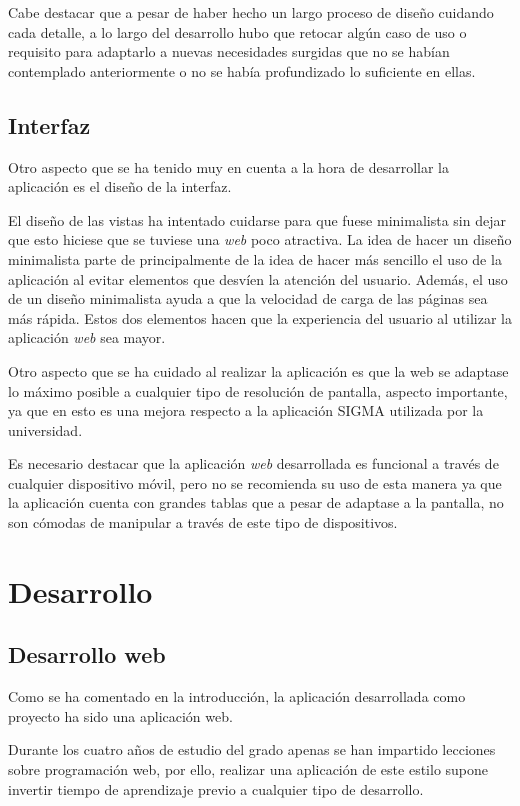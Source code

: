 Cabe destacar que a pesar de haber hecho un largo proceso de diseño cuidando cada detalle, a lo largo del desarrollo hubo que retocar algún caso de uso o requisito para adaptarlo a nuevas necesidades surgidas que no se habían contemplado anteriormente o no se había profundizado lo suficiente en ellas.

\subsection{Interfaz}
Otro aspecto que se ha tenido muy en cuenta a la hora de desarrollar la aplicación es el diseño de la interfaz.

El diseño de las vistas ha intentado cuidarse para que fuese minimalista sin dejar que esto hiciese que se tuviese una \textit{web} poco atractiva.
La idea de hacer un diseño minimalista parte de principalmente de la idea de hacer más sencillo el uso de la aplicación al evitar elementos que desvíen la atención del usuario.
Además, el uso de un diseño minimalista ayuda a que la velocidad de carga de las páginas sea más rápida.
Estos dos elementos hacen que la experiencia del usuario al utilizar la aplicación \textit{web} sea mayor.

Otro aspecto que se ha cuidado al realizar la aplicación es que la web se adaptase lo máximo posible a cualquier tipo de resolución de pantalla, aspecto importante, ya que en esto es una mejora respecto a la aplicación SIGMA utilizada por la universidad.

Es necesario destacar que la aplicación \textit{web} desarrollada es funcional a través de cualquier dispositivo móvil, pero no se recomienda su uso de esta manera ya que la aplicación cuenta con grandes tablas que a pesar de adaptase a la pantalla, no son cómodas de manipular a través de este tipo de dispositivos.

\section{Desarrollo}
\subsection{Desarrollo web}
Como se ha comentado en la introducción, la aplicación desarrollada como proyecto ha sido una aplicación web.

Durante los cuatro años de estudio del grado apenas se han impartido lecciones sobre programación web, por ello, realizar una aplicación de este estilo supone invertir tiempo de aprendizaje previo a cualquier tipo de desarrollo.

